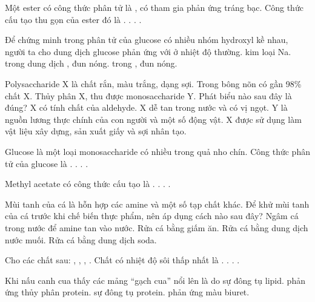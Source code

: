 \documentclass[11pt,a4paper]{article}
\begin{document}
\begin{ex}
Một ester có công thức phân tử là , có tham gia phản ứng tráng bạc. Công thức cấu tạo thu gọn của ester đó là
\choice
{.}
{.}
{.}
{.}
\loigiai{}
\end{ex}
\begin{ex}
Để chứng minh trong phân tử của glucose có nhiều nhóm hydroxyl kề nhau, người ta cho dung dịch glucose phản ứng với
\choice
{ ở nhiệt độ thường.}
{kim loại Na.}
{ trong dung dịch , đun nóng.}
{ trong , đun nóng.}
\loigiai{}
\end{ex}
\begin{ex}
Polysaccharide X là chất rắn, màu trắng, dạng sợi. Trong bông nõn có gần 98\% chất X. Thủy phân X, thu được monosaccharide Y. Phát biểu nào sau đây là đúng?
\choice
{X có tính chất của aldehyde.}
{X dễ tan trong nước và có vị ngọt.}
{Y là nguồn lương thực chính của con người và một số động vật.}
{X được sử dụng làm vật liệu xây dựng, sản xuất giấy và sợi nhân tạo.}
\loigiai{}
\end{ex}
\begin{ex}
Glucose là một loại monosaccharide có nhiều trong quả nho chín. Công thức phân tử của glucose là
\choice
{.}
{.}
{.}
{.}
\loigiai{}
\end{ex}
\begin{ex}
Methyl acetate có công thức cấu tạo là
\choice
{.}
{.}
{.}
{.}
\loigiai{}
\end{ex}
\begin{ex}
Mùi tanh của cá là hỗn hợp các amine và một số tạp chất khác. Để khử mùi tanh của cá trước khi chế biến thực phẩm, nên áp dụng cách nào sau đây?
\choice
{Ngâm cá trong nước để amine tan vào nước.}
{Rửa cá bằng giấm ăn.}
{Rửa cá bằng dung dịch nước muối.}
{Rửa cá bằng dung dịch soda.}
\loigiai{}
\end{ex}
\begin{ex}
Cho các chất sau: , , , . Chất có nhiệt độ sôi thấp nhất là
\choice
{.}
{.}
{.}
{.}
\loigiai{}
\end{ex}
\begin{ex}
Khi nấu canh cua thấy các mảng ``gạch cua'' nổi lên là do
\choice
{sự đông tụ lipid.}
{phản ứng thủy phân protein.}
{sự đông tụ protein.}
{phản ứng màu biuret.}
\loigiai{}
\end{ex}
\end{document}
